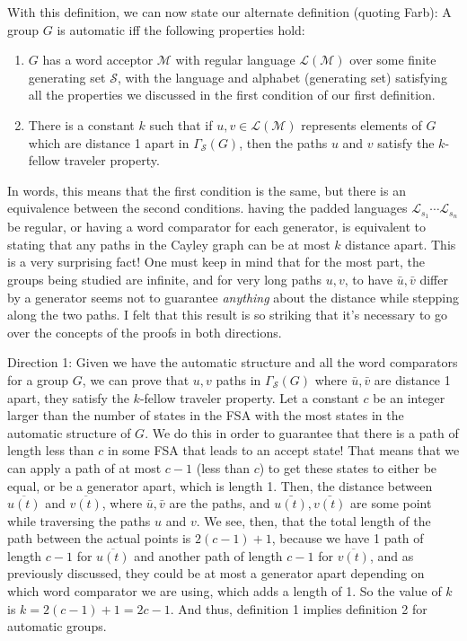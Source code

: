 \documentclass[12pt]{amsart}
\begin{document}
With this definition, we can now state our alternate definition (quoting Farb): A group $G$ is automatic iff the following properties hold:
\begin{enumerate}
\item $G$ has a word acceptor $\mathcal{M}$ with regular language $\mathcal{L}(\mathcal{M})$ over some finite generating set $\mathcal{S}$, with the language and alphabet (generating set) satisfying all the properties we discussed in the first condition of our first definition.
\item There is a constant $k$ such that if $u,v\in \mathcal{L}(\mathcal{M})$ represents elements of $G$ which are distance 1 apart in $\Gamma_\mathcal{S}(G)$, then the paths $u$ and $v$ satisfy the $k$-fellow traveler property.
\end{enumerate}

In words, this means that the first condition is the same, but there is an equivalence between the second conditions. having the padded languages $\mathcal{L}_{s_1}\cdots \mathcal{L}_{s_n}$ be regular, or having a word comparator for each generator, is equivalent to stating that any paths in the Cayley graph can be at most $k$ distance apart. This is a very surprising fact! One must keep in mind that for the most part, the groups being studied are infinite, and for very long paths $u,v$, to have $\bar{u},\bar{v}$ differ by a generator seems not to guarantee \emph{anything} about the distance while stepping along the two paths. I felt that this result is so striking that it's necessary to go over the concepts of the proofs in both directions.

Direction 1: Given we have the automatic structure and all the word comparators for a group $G$, we can prove that $u,v$ paths in $\Gamma_\mathcal{S}(G)$ where $\bar{u},\bar{v}$ are distance 1 apart, they satisfy the $k$-fellow traveler property. Let a constant $c$ be an integer larger than the number of states in the FSA with the most states in the automatic structure of $G$. We do this in order to guarantee that there is a path of length less than $c$ in some FSA that leads to an accept state! That means that we can apply a path of at most $c-1$ (less than $c$) to get these states to either be equal, or be a generator apart, which is length 1. Then, the distance between $\overline{u(t)}$ and $\overline{v(t)}$, where $\bar{u},\bar{v}$ are the paths, and $\bar{u(t)},\bar{v(t)}$ are some point while traversing the paths $u$ and $v$. We see, then, that the total length of the path between the actual points is $2(c-1)+1$, because we have 1 path of length $c-1$ for $\overline{u(t)}$ and another path of length $c-1$ for $\overline{v(t)}$, and as previously discussed, they could be at most a generator apart depending on which word comparator we are using, which adds a length of 1. So the value of $k$ is $k=2(c-1)+1=2c-1$. And thus, definition 1 implies definition 2 for automatic groups.
\end{document}
